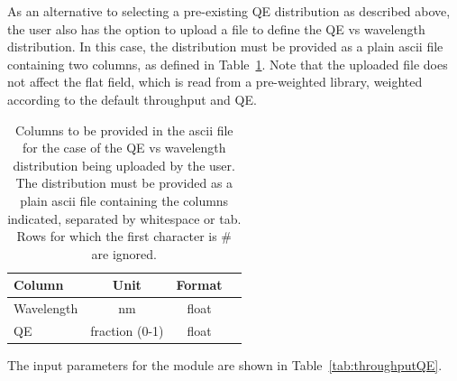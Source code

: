 \documentclass[11pt]{article}      %
\def\HCode#1{}
\def\htmlanchor#1{\HCode{<a id="#1"></a>}}
\begin{document}
\htmlanchor{qeUploadFile}
As an alternative to selecting a pre-existing QE distribution as described above, the user also has the option to upload a file to define the QE vs wavelength distribution. In this case, the distribution must be provided as a plain ascii file containing two columns, as defined in Table~\ref{tab:qeUploadFormat}. Note that the uploaded file does not affect the flat field, which is read from a pre-weighted library, weighted according to the default throughput and QE.

\begin{table}[hb]
  \begin{center}
  \caption{Columns to be provided in the ascii file for the case of the QE vs wavelength distribution being uploaded by the user. The distribution must be provided as a plain ascii file containing the columns indicated, separated by whitespace or tab. Rows for which the first character is \# are ignored.}
  \begin{tabular}{| l | c | c | l |}
    \hline
Column & Unit & Format \\
    \hline
Wavelength & nm & float \\
QE & fraction (0-1) & float \\
    \hline
  \end{tabular}
  \label{tab:qeUploadFormat}
\end{center}
\end{table}

The input parameters for the module are shown in Table~\ref{tab:throughputQE}.
\end{document}
